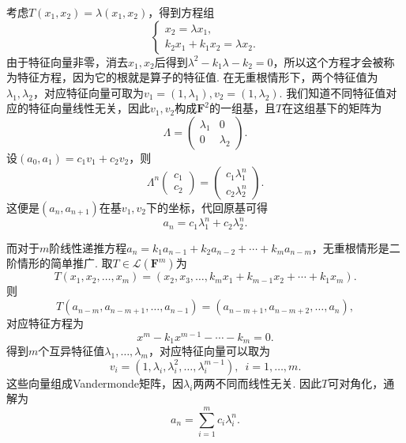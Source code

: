 考虑$T(x_1,x_2)=\lambda(x_1,x_2)$，得到方程组
\[
    \begin{cases}
        x_2=\lambda x_1,\\
        k_2x_1+k_1x_2=\lambda x_2.
    \end{cases}
\]
由于特征向量非零，消去$x_1,x_2$后得到$\lambda^2-k_1\lambda-k_2=0$，所以这个方程才会被称为特征方程，因为它的根就是算子的特征值. 在无重根情形下，两个特征值为$\lambda_1,\lambda_2$，对应特征向量可取为$v_1=(1,\lambda_1), v_2=(1,\lambda_2)$. 我们知道不同特征值对应的特征向量线性无关，因此$v_1,v_2$构成$\mathbf{F}^2$的一组基，且$T$在这组基下的矩阵为
\[
    \Lambda=\begin{pmatrix}
        \lambda_1 & 0 \\ 0 & \lambda_2
    \end{pmatrix}.
\]
设$(a_0,a_1)=c_1v_1+c_2v_2$，则
\[
    \Lambda^n \begin{pmatrix}
        c_1 \\ c_2
    \end{pmatrix} = \begin{pmatrix}
        c_1 \lambda_1^n \\ c_2 \lambda_2^n
    \end{pmatrix}.
\]
这便是$(a_n,a_{n+1})$在基$v_1,v_2$下的坐标，代回原基可得
\[
    a_n=c_1\lambda_1^n+c_2\lambda_2^n.
\]

而对于$m$阶线性递推方程$a_n=k_1a_{n-1}+k_2a_{n-2}+\cdots+k_ma_{n-m}$，无重根情形是二阶情形的简单推广. 取$T\in\mathcal{L}(\mathbf{F}^m)$为
\[
    T(x_1,x_2,\ldots,x_m)=(x_2,x_3,\ldots,k_mx_1+k_{m-1}x_2+\cdots+k_1x_m).
\]
则
\[
    T(a_{n-m},a_{n-m+1},\ldots,a_{n-1})=(a_{n-m+1},a_{n-m+2},\ldots,a_n),
\]
对应特征方程为
\[
    x^m-k_1x^{m-1}-\cdots-k_m=0.
\]
得到$m$个互异特征值$\lambda_1,\ldots,\lambda_m$，对应特征向量可以取为
\[
    v_i=(1,\lambda_i,\lambda_i^2,\ldots,\lambda_i^{m-1}),\enspace i=1,\ldots,m.
\]
这些向量组成Vandermonde矩阵，因$\lambda_i$两两不同而线性无关. 因此$T$可对角化，通解为
\[
    a_n=\sum_{i=1}^m c_i\lambda_i^n.
\]

